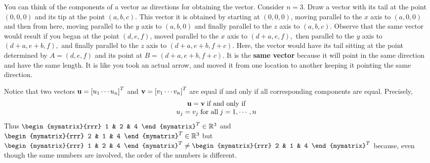 You can think of the components of a vector as directions for
obtaining the vector. Consider $n=3$.  Draw a vector with its tail at
the point $\left( 0,0,0\right) $ and its tip at the point $\left(
a,b,c\right) $. This vector it is obtained by starting at $\left(
0,0,0\right) $, moving parallel to the $x$ axis to $\left(
a,0,0\right) $ and then from here, moving parallel to the $y$ axis to
$\left( a,b,0\right) $ and finally parallel to the $z$ axis to $\left(
a,b,c\right). $ Observe that the same vector would result if you began
at the point $ \left( d,e,f \right)$, moved parallel to the $x$ axis
to $\left( d+a,e,f\right) ,$ then parallel to the $y$ axis to $\left(
d+a,e+b,f\right) ,$ and finally parallel to the $z$ axis to $\left(
d+a,e+b,f+c\right)$. Here, the vector would have its tail sitting at
the point determined by $A= \left( d,e,f\right) $ and its point at
$B=\left( d+a,e+b,f+c\right)$. It is the \textbf{same vector} because
it will point in the same direction and have the same length. It is
like you took an actual arrow, and moved it from one location to another keeping it pointing
the same direction.

Notice that two vectors ${\bf u} = \left[ u_{1} \cdots u_{n}\right]^T $ and
${\bf v}=\left[ v_{1} \cdots v_{n}\right]^T$ are equal if and only if
all corresponding components are equal. Precisely,
\begin{equation*}
\begin{array}{c}
{\bf u}={\bf v} \; \mbox{if and only if}\\
u_{j}=v_{j} \; \mbox{for all}\; j=1,\cdots ,n
\end{array}
\end{equation*} 
Thus 
$\begin{mymatrix}{rrr}
1  & 2 & 4
\end{mymatrix}^T \in \R^{3}$ and $\begin{mymatrix}{rrr}
2 & 1 & 4
\end{mymatrix}^T \in
\R^{3}$ but $\begin{mymatrix}{rrr}
1 & 2 & 4
\end{mymatrix}^T \neq \begin{mymatrix}{rrr}
2 & 1 & 4
\end{mymatrix}^T $ because,
even though the same numbers are involved, the order of the numbers is different. 

